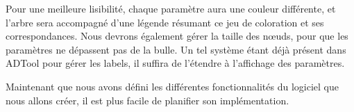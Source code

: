 		Pour une meilleure lisibilité, chaque paramètre aura une couleur différente, et l'arbre sera accompagné d'une légende résumant ce jeu de coloration et ses correspondances. Nous devrons également gérer la taille des nœuds, pour que les paramètres ne dépassent pas de la bulle. Un tel système étant déjà présent dans ADTool pour gérer les labels, il suffira de l'étendre à l'affichage des paramètres.

		Maintenant que nous avons défini les différentes fonctionnalités du logiciel que nous allons créer, il est plus facile de planifier son implémentation.
